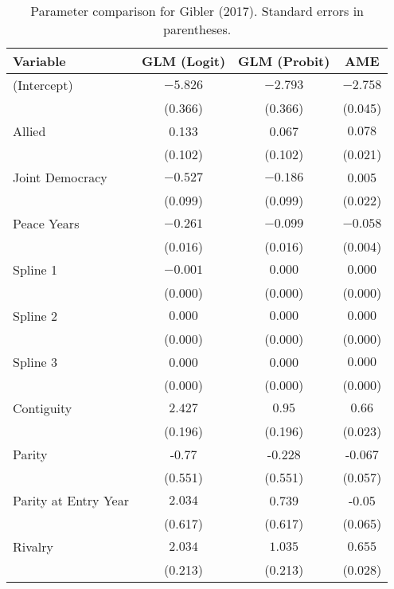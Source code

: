 \begin{table}[ht]
\centering
\begingroup\normalsize
\begin{tabular}{lccc}
 Variable & GLM (Logit) & GLM (Probit) & AME \\ 
  \hline
\hline
(Intercept) & $-5.826$ & $-2.793$ & $-2.758$ \\
   & (0.366) & (0.366) & (0.045) \\ 
  Allied & 0.133 & 0.067 & $0.078$ \\
   & (0.102) & (0.102) & (0.021) \\ 
  Joint Democracy & $-0.527$ & $-0.186$ & 0.005 \\
   & (0.099) & (0.099) & (0.022) \\ 
  Peace Years & $-0.261$ & $-0.099$ & $-0.058$ \\
   & (0.016) & (0.016) & (0.004) \\ 
  Spline 1 & $-0.001$ & $0.000$ & $0.000$ \\
   & (0.000) & (0.000) & (0.000) \\ 
  Spline 2 & $0.000$ & $0.000$ & $0.000$ \\
   & (0.000) & (0.000) & (0.000) \\ 
  Spline 3 & 0.000 & 0.000 & $0.000$ \\
   & (0.000) & (0.000) & (0.000) \\ 
  Contiguity & $2.427$ & $0.95$ & $0.66$ \\
   & (0.196) & (0.196) & (0.023) \\ 
  Parity & -0.77 & -0.228 & -0.067 \\ 
   & (0.551) & (0.551) & (0.057) \\ 
  Parity at Entry Year & $2.034$ & 0.739 & -0.05 \\
   & (0.617) & (0.617) & (0.065) \\ 
  Rivalry & $2.034$ & $1.035$ & $0.655$ \\
   & (0.213) & (0.213) & (0.028) \\ 
   \hline
\hline
\end{tabular}
\endgroup
\caption{Parameter comparison for Gibler (2017). Standard errors in parentheses.} 
\label{tab:gibler_coef}
\end{table}
